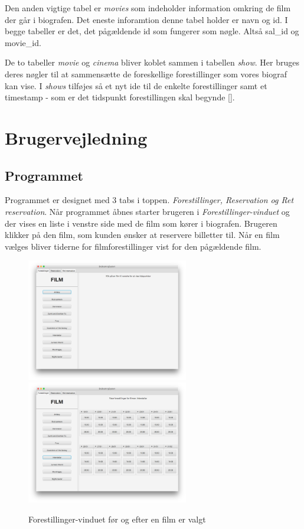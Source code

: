 \documentclass[final]{report}
\begin{document}
Den anden vigtige tabel er \emph{movies} som indeholder information omkring de film der går i biografen. Det eneste inforamtion denne tabel holder er navn og id. I begge tabeller er det, det pågældende id som fungerer som nøgle. Altså sal\_id og movie\_id.  

De to tabeller \emph{movie} og \emph{cinema} bliver koblet sammen i tabellen \emph{show}. Her bruges deres nøgler til at sammensætte de foreskellige forestillinger som vores biograf kan vise. I \emph{shows} tilføjes så et nyt ide til de enkelte forestillinger samt et timestamp - som er det tidspunkt forestillingen skal begynde [\cite{GRPRO}].


\chapter{Brugervejledning}
\section{Programmet}
Programmet er designet med 3 tabs i toppen. \emph{Forestillinger, Reservation og Ret reservation}. Når programmet åbnes starter brugeren i \emph{Forestillinger-vinduet} og der vises en liste i venstre side med de film som kører i biografen. Brugeren klikker på den film, som kunden ønsker at reservere billetter til. Når en film vælges bliver tiderne for filmforestillinger vist for den pågældende film. \\


\begin{figure}[h]
\centering
\includegraphics[width=200pt]{1.png}
\includegraphics[width=200pt]{2.png}
\caption{Forestillinger-vinduet før og efter en film er valgt}
\end{figure}
\end{document}
